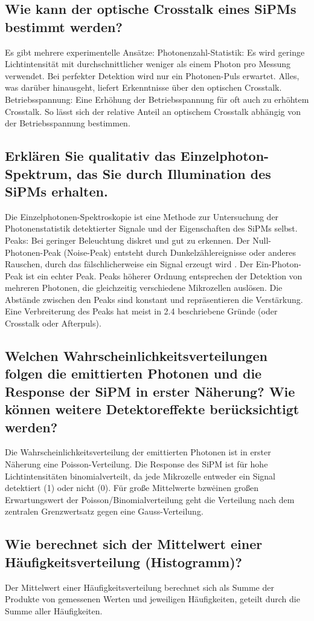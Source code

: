 \documentclass[12pt]{article}
\begin{document}
\subsection{Wie kann der optische Crosstalk eines SiPMs bestimmt werden?}
Es gibt mehrere experimentelle Ansätze:
Photonenzahl-Statistik: Es wird geringe Lichtintensität mit durchschnittlicher weniger als einem Photon pro Messung verwendet.
Bei perfekter Detektion wird nur ein Photonen-Puls erwartet.
Alles, was darüber hinausgeht, liefert Erkenntnisse über den optischen Crosstalk.
Betriebsspannung: Eine Erhöhung der Betriebsspannung für oft auch zu erhöhtem Crosstalk.
So lässt sich der relative Anteil an optischem Crosstalk abhängig von der Betriebsspannung bestimmen.
\subsection{Erklären Sie qualitativ das Einzelphoton-Spektrum, das Sie durch Illumination des SiPMs erhalten.}
Die Einzelphotonen-Spektroskopie ist eine Methode zur Untersuchung der Photonenstatistik detektierter Signale und der Eigenschaften des SiPMs selbst.
Peaks: Bei geringer Beleuchtung diskret und gut zu erkennen.
Der Null-Photonen-Peak (Noise-Peak) entsteht durch Dunkelzählereignisse oder anderes Rauschen, durch das fälschlicherweise ein Signal erzeugt wird .
Der Ein-Photon-Peak ist ein echter Peak.
Peaks höherer Ordnung entsprechen der Detektion von mehreren Photonen, die gleichzeitig verschiedene Mikrozellen auslösen.
Die Abstände zwischen den Peaks sind konstant und repräsentieren die Verstärkung.
Eine Verbreiterung des Peaks hat meist in 2.4 beschriebene Gründe (oder Crosstalk oder Afterpuls).

\subsection{Welchen Wahrscheinlichkeitsverteilungen folgen die emittierten Photonen und die Response der SiPM in erster Näherung?
Wie können weitere Detektoreffekte berücksichtigt werden?}
Die Wahrscheinlichkeitsverteilung der emittierten Photonen ist in erster Näherung eine Poisson-Verteilung.
Die Response des SiPM ist für hohe Lichtintensitäten binomialverteilt, da jede Mikrozelle entweder ein Signal detektiert (1) oder nicht (0).
Für große Mittelwerte bzw\. einen großen Erwartungswert der Poisson/Binomialverteilung geht die Verteilung nach dem zentralen Grenzwertsatz gegen eine Gauss-Verteilung.

\subsection{Wie berechnet sich der Mittelwert einer Häufigkeitsverteilung (Histogramm)?}
Der Mittelwert einer Häufigkeitsverteilung berechnet sich als Summe der Produkte von gemessenen Werten und jeweiligen Häufigkeiten, geteilt durch die Summe aller Häufigkeiten.
\end{document}
